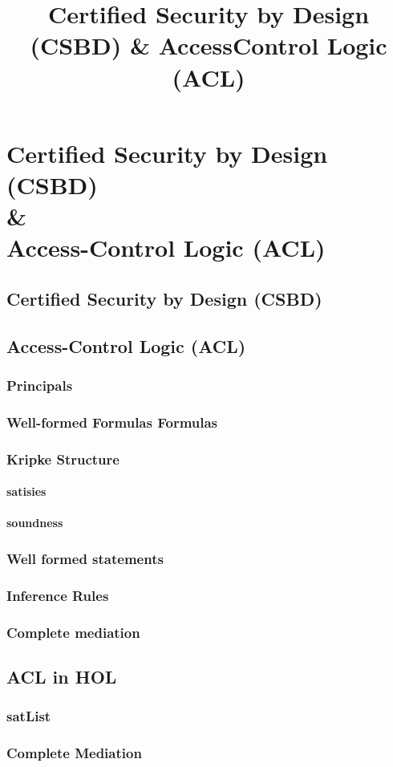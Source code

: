 \documentclass[../../main/main.tex]{subfiles}
\begin{document}
\title{Certified Security by Design (CSBD) \& Access\-Control Logic (ACL)}

\chapter[Certified Security by Design (CSBD) \& Access-Control Logic (ACL)]{Certified Security by Design (CSBD)  \\ \& \\ Access-Control Logic (ACL)} \label{chp:csbdacl}


\section{Certified Security by Design (CSBD)} \label{sec:csbd}

\section{Access-Control Logic (ACL)} \label{sec:acl}

\subsection{Principals}
\subsection{Well-formed Formulas Formulas}
\subsection{Kripke Structure}

\subsubsection{satisies}
\subsubsection{soundness}

\subsection{Well formed statements}
\subsection{Inference Rules}
\subsection{Complete mediation}

\section{ACL in HOL} \label{sec:aclinhol}

\subsection{satList}
\subsection{Complete Mediation}
\end{document}
